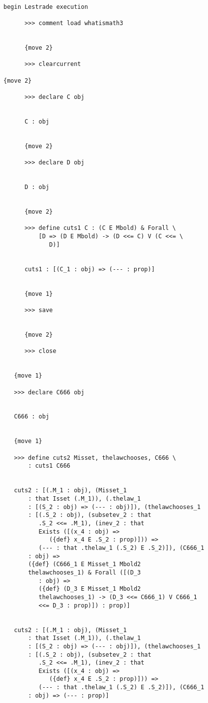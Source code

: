\documentclass[12pt]{article}
\begin{document}
\begin{verbatim}

begin Lestrade execution

      >>> comment load whatismath3


      {move 2}

      >>> clearcurrent

{move 2}

      >>> declare C obj


      C : obj


      {move 2}

      >>> declare D obj


      D : obj


      {move 2}

      >>> define cuts1 C : (C E Mbold) & Forall \
          [D => (D E Mbold) -> (D <<= C) V (C <<= \
             D)]


      cuts1 : [(C_1 : obj) => (--- : prop)]


      {move 1}

      >>> save


      {move 2}

      >>> close


   {move 1}

   >>> declare C666 obj


   C666 : obj


   {move 1}

   >>> define cuts2 Misset, thelawchooses, C666 \
       : cuts1 C666


   cuts2 : [(.M_1 : obj), (Misset_1 
       : that Isset (.M_1)), (.thelaw_1 
       : [(S_2 : obj) => (--- : obj)]), (thelawchooses_1 
       : [(.S_2 : obj), (subsetev_2 : that 
          .S_2 <<= .M_1), (inev_2 : that 
          Exists ([(x_4 : obj) => 
             ({def} x_4 E .S_2 : prop)])) => 
          (--- : that .thelaw_1 (.S_2) E .S_2)]), (C666_1 
       : obj) => 
       ({def} (C666_1 E Misset_1 Mbold2 
       thelawchooses_1) & Forall ([(D_3 
          : obj) => 
          ({def} (D_3 E Misset_1 Mbold2 
          thelawchooses_1) -> (D_3 <<= C666_1) V C666_1 
          <<= D_3 : prop)]) : prop)]


   cuts2 : [(.M_1 : obj), (Misset_1 
       : that Isset (.M_1)), (.thelaw_1 
       : [(S_2 : obj) => (--- : obj)]), (thelawchooses_1 
       : [(.S_2 : obj), (subsetev_2 : that 
          .S_2 <<= .M_1), (inev_2 : that 
          Exists ([(x_4 : obj) => 
             ({def} x_4 E .S_2 : prop)])) => 
          (--- : that .thelaw_1 (.S_2) E .S_2)]), (C666_1 
       : obj) => (--- : prop)]



\end{verbatim}
\end{document}

